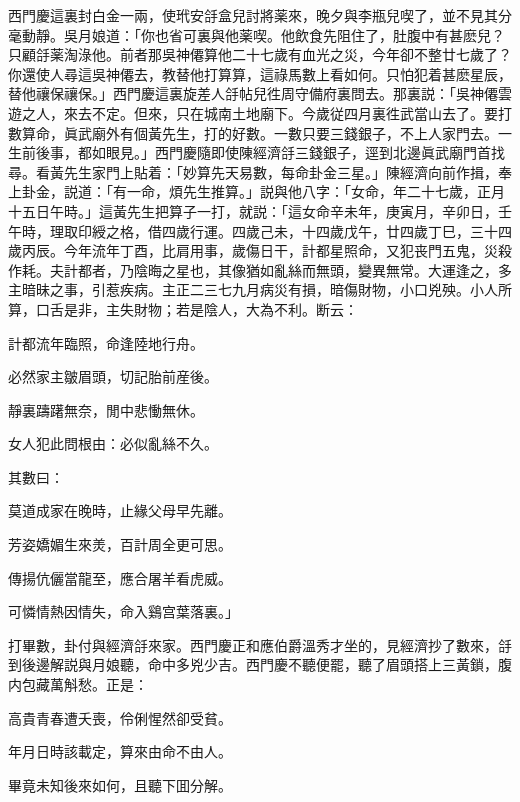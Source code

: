 西門慶這裏封白金一兩，使玳安㧱盒兒討將薬來，晚夕與李瓶兒喫了，並不見其分毫動靜。吳月娘道：「你也省可裏與他薬喫。他飲食先阻住了，肚腹中有甚麽兒？只顧㧱薬淘淥他。前者那吳神僊算他二十七歲有血光之災，今年卻不整廿七歲了？你還使人尋這吳神僊去，教替他打算算，這祿馬數上看如何。只怕犯着甚麽星辰，替他禳保禳保。」西門慶這裏旋差人㧱帖兒徃周守備府裏問去。那裏説：「吳神僊雲遊之人，來去不定。但來，只在城南土地廟下。今歲従四月裏徃武當山去了。要打數算命，眞武廟外有個黃先生，打的好數。一數只要三錢銀子，不上人家門去。一生前後事，都如眼見。」西門慶隨即使陳經濟㧱三錢銀子，逕到北邊眞武廟門首找尋。看黃先生家門上貼着：「妙算先天易數，每命卦金三星。」陳經濟向前作揖，奉上卦金，説道：「有一命，煩先生推算。」説與他八字：「女命，年二十七歲，正月十五日午時。」這黃先生把算子一打，就説：「這女命辛未年，庚寅月，辛卯日，壬午時，理取印綬之格，借四歲行運。四歲己未，十四歲戊午，廿四歲丁巳，三十四歲丙辰。今年流年丁酉，比肩用事，歲傷日干，計都星照命，又犯丧門五鬼，災殺作耗。夫計都者，乃陰晦之星也，其像猶如亂絲而無頭，變異無常。大運逢之，多主暗昧之事，引惹疾病。主正二三七九月病災有損，暗傷財物，小口兇殃。小人所算，口舌是非，主失財物；若是陰人，大為不利。断云：

\begin{myquote}
計都流年臨照，命逢陸地行舟。

必然家主皺眉頭，切記胎前産後。

靜裏躊躇無奈，閒中悲慟無休。

女人犯此問根由：必似亂絲不久。　
\end{myquote}

其數曰：

\begin{myquote}
莫道成家在晚時，止緣父母早先離。

芳姿嬌媚生來羙，百計周全更可思。

傳揚伉儷當龍至，應合屠羊看虎威。

可憐情熱因情失，命入鷄宫葉落裏。」
\end{myquote}

打畢數，卦付與經濟㧱來家。西門慶正和應伯爵溫秀才坐的，見經濟抄了數來，㧱到後邊解説與月娘聽，命中多兇少吉。西門慶不聽便罷，聽了眉頭搭上三黃鎖，腹内包藏萬斛愁。正是：

\begin{myquote}
高貴青春遭夭喪，伶俐惺然卻受貧。

年月日時該載定，算來由命不由人。
\end{myquote}

畢竟未知後來如何，且聽下囬分解。

